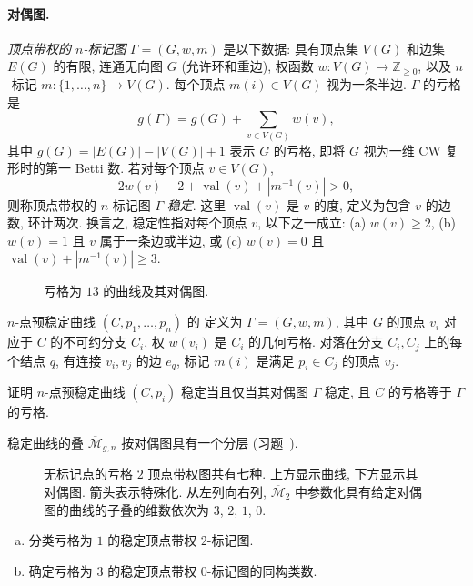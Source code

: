 \paragraph{对偶图.}
\textit{顶点带权的 $n$-标记图} $\Gamma=(G,\allowbreak w,\allowbreak m)$ 是以下数据: 具有顶点集 $V(G)$ 和边集 $E(G)$ 的有限, 连通无向图 $G$ (允许环和重边), 权函数 $w:V(G)\to\mathbb Z_{\geq0}$, 以及 $n$-标记 $m:\{1,\allowbreak \ldots,\allowbreak n\}\to\allowbreak V(G)$. 每个顶点 $m(i)\in V(G)$ 视为一条半边. $\Gamma$ 的亏格是
\[
g(\Gamma)=g(G)+\sum_{v\in V(G)}w(v),
\]
其中 $g(G)=|E(G)|-|V(G)|+1$ 表示 $G$ 的亏格, 即将 $G$ 视为一维 CW 复形时的第一 Betti 数. 若对每个顶点 $v\in V(G)$,
\[
2w(v)-2+\operatorname{val}(v)+|m^{-1}(v)|>0,
\]
则称顶点带权的 $n$-标记图 $\Gamma$ \textit{稳定}. 这里 $\operatorname{val}(v)$ 是 $v$ 的度, 定义为包含 $v$ 的边数, 环计两次. 换言之, 稳定性指对每个顶点 $v$, 以下之一成立: (a) $w(v)\geq2$, (b) $w(v)=1$ 且 $v$ 属于一条边或半边, 或 (c) $w(v)=0$ 且 $\operatorname{val}(v)+|m^{-1}(v)|\geq3$.
\begin{figure}[H]\centering
\begingroup\renewcommand{\thefigure}{6.3.8}\renewcommand{\theHfigure}{6.3.8-figure}\caption{亏格为 $13$ 的曲线及其对偶图.}\label{src:6.3.8-figure}\endgroup
\addtocounter{theorem}{-1}
\end{figure}
\begin{definition}[对偶图]\label{src:6.3.9}
$n$-点预稳定曲线 $(C,\allowbreak p_1,\allowbreak \ldots,\allowbreak p_n)$ 的 定义为 $\Gamma=(G,\allowbreak w,\allowbreak m)$, 其中 $G$ 的顶点 $v_i$ 对应于 $C$ 的不可约分支 $C_i$, 权 $w(v_i)$ 是 $C_i$ 的几何亏格. 对落在分支 $C_i,\allowbreak C_j$ 上的每个结点 $q$, 有连接 $v_i,\allowbreak v_j$ 的边 $e_q$, 标记 $m(i)$ 是满足 $p_i\in C_j$ 的顶点 $v_j$.
\end{definition}
\begin{exercise}[容易]\label{src:6.3.10}
证明 $n$-点预稳定曲线 $(C,\allowbreak p_i)$ 稳定当且仅当其对偶图 $\Gamma$ 稳定, 且 $C$ 的亏格等于 $\Gamma$ 的亏格.
\end{exercise}
稳定曲线的叠 $\overline{\mathcal M}_{g,\allowbreak n}$ 按对偶图具有一个分层 (习题~).
\begin{figure}[H]\centering
\begingroup\renewcommand{\thefigure}{6.3.10}\renewcommand{\theHfigure}{6.3.10-figure}\caption{无标记点的亏格 $2$ 顶点带权图共有七种. 上方显示曲线, 下方显示其对偶图. 箭头表示特殊化. 从左列向右列, $\overline{\mathcal M}_2$ 中参数化具有给定对偶图的曲线的子叠的维数依次为 $3$, $2$, $1$, $0$.}\label{src:6.3.10-figure}\endgroup
\addtocounter{theorem}{-1}
\end{figure}
\begin{exercise}\label{src:6.3.11}
\begin{enumerate}[(a)]
\item 分类亏格为 $1$ 的稳定顶点带权 $2$-标记图.
\item 确定亏格为 $3$ 的稳定顶点带权 $0$-标记图的同构类数.
\end{enumerate}
\end{exercise}
